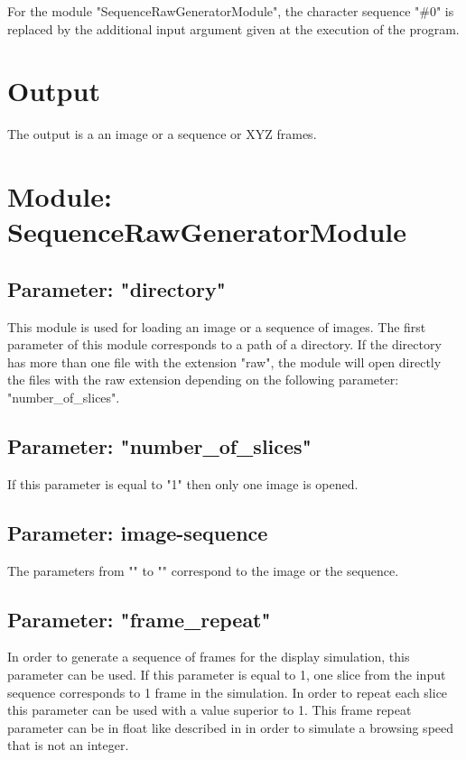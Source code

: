 For the module "SequenceRawGeneratorModule", the character sequence "$\#0$" is replaced by the additional input argument given at the execution of the program. 

\section{Output}

The output is a an image or a sequence or XYZ frames.

\section{Module: SequenceRawGeneratorModule}

\subsection{Parameter: "directory"}

This module is used for loading an image or a sequence of images. The first parameter of this module corresponds to a path of a directory. If the directory has more than one file with the extension "raw", the module will open directly the files with the raw extension depending on the following parameter: "number\_of\_slices".

\subsection{Parameter: "number\_of\_slices"}

If this parameter is equal to "1" then only one image is opened.

\subsection{Parameter: image-sequence}

The parameters from "" to "" correspond to the image or the sequence.

\subsection{Parameter: "frame\_repeat"}

In order to generate a sequence of frames for the display simulation, this parameter can be used. If this parameter is equal to 1, one slice from the input sequence corresponds to 1 frame in the simulation. In order to repeat each slice this parameter can be used with a value superior to 1. This frame repeat parameter can be in float like described in \cite{Mar12} in order to simulate a browsing speed that is not an integer.

